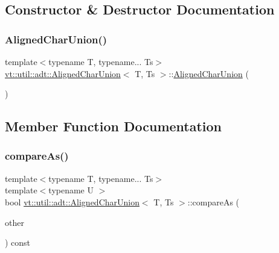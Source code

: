 \subsection{Constructor \& Destructor Documentation}
\mbox{\label{structvt_1_1util_1_1adt_1_1_aligned_char_union_a8d0afe238f4a44735bb37be847f55c45}} 
\subsubsection{\texorpdfstring{Aligned\+Char\+Union()}{AlignedCharUnion()}}
{\footnotesize\ttfamily template$<$typename T, typename... Ts$>$ \\
\hyperlink{structvt_1_1util_1_1adt_1_1_aligned_char_union}{vt\+::util\+::adt\+::\+Aligned\+Char\+Union}$<$ T, Ts $>$\+::\hyperlink{structvt_1_1util_1_1adt_1_1_aligned_char_union}{Aligned\+Char\+Union} (\begin{DoxyParamCaption}{ }\end{DoxyParamCaption})\hspace{0.3cm}{\ttfamily [default]}}



\subsection{Member Function Documentation}
\mbox{\label{structvt_1_1util_1_1adt_1_1_aligned_char_union_ac2ba0a705e45724c9882b904b5c1231b}} 
\subsubsection{\texorpdfstring{compare\+As()}{compareAs()}}
{\footnotesize\ttfamily template$<$typename T, typename... Ts$>$ \\
template$<$typename U $>$ \\
bool \hyperlink{structvt_1_1util_1_1adt_1_1_aligned_char_union}{vt\+::util\+::adt\+::\+Aligned\+Char\+Union}$<$ T, Ts $>$\+::compare\+As (\begin{DoxyParamCaption}\item[{\hyperlink{structvt_1_1util_1_1adt_1_1_aligned_char_union}{Aligned\+Char\+Union}$<$ T, Ts $>$ const $\ast$}]{other }\end{DoxyParamCaption}) const\hspace{0.3cm}{\ttfamily [inline]}}

